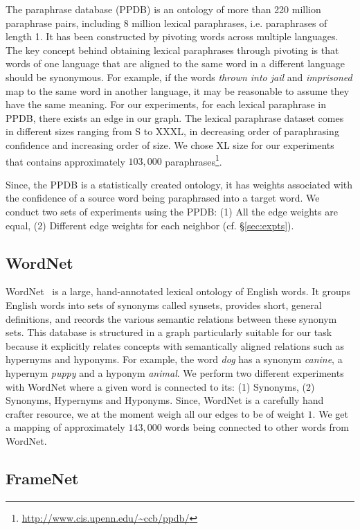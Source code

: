 \documentclass[11pt]{article}
\begin{document}
The paraphrase database (PPDB) \cite{ganitkevitch2013ppdb} is an ontology of more than 220 million paraphrase pairs, including 8 million lexical paraphrases, i.e. paraphrases of length 1. It has been constructed by pivoting words across multiple languages. The key concept behind obtaining lexical paraphrases through pivoting is that words of one language that are aligned to the same word in a different language should be synonymous. For example, if the words \textit{thrown into jail} and \textit{imprisoned} map to the same word in another language, it may be reasonable to assume they have the same meaning. For our experiments, for each lexical paraphrase in PPDB, there exists an edge in our graph. The lexical paraphrase dataset comes in different sizes ranging from S to XXXL, in decreasing order of paraphrasing confidence and increasing order of size. We chose XL size for our experiments that contains approximately $103,000$ paraphrases\footnote{\url{http://www.cis.upenn.edu/~ccb/ppdb/}}.

Since, the PPDB is a statistically created ontology, it has weights associated 
with the confidence
of a source word being paraphrased into a target word. We conduct two sets of 
experiments using the 
PPDB: (1) All the edge weights are equal, (2) Different edge weights for each neighbor (cf. \S\ref{sec:expts}). 

\subsection{WordNet} 
\label{sec:wordnet}

WordNet~\cite{miller:1995} is a large, hand-annotated lexical ontology of English words. 
It groups English words into sets of synonyms called synsets, provides short, general definitions, and records the various semantic relations between these synonym sets.
This database is structured in a graph particularly suitable for our task because it explicitly relates concepts with semantically aligned relations such as hypernyms and hyponyms. For example, the word \textit{dog} has a synonym \textit{canine}, a hypernym \textit{puppy} and a hyponym \textit{animal}. We perform two different experiments with WordNet where a given word is connected to
its: (1) Synonyms, (2) Synonyms, Hypernyms and Hyponyms. Since, WordNet is a carefully hand crafter resource, we at the moment weigh all our edges to be of weight $1$. We get a mapping of approximately $143,000$ words being connected to other words from WordNet.

\subsection{FrameNet}
\label{sec:framenet}
\end{document}
